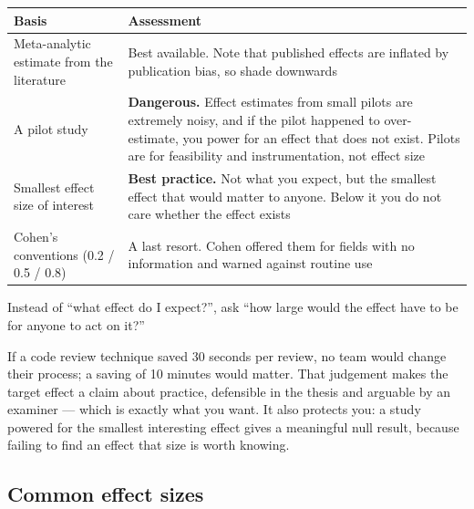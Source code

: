 \begin{center}
\small
\begin{tabular}{@{}L{4.0cm}L{10.3cm}@{}}
\toprule
\textbf{Basis} & \textbf{Assessment} \\
\midrule
Meta-analytic estimate from the literature
  & Best available. Note that published effects are inflated by publication
    bias, so shade downwards \\
A pilot study
  & \textbf{Dangerous.} Effect estimates from small pilots are extremely noisy,
    and if the pilot happened to over-estimate, you power for an effect that
    does not exist. Pilots are for feasibility and instrumentation, not effect
    size \\
Smallest effect size of interest
  & \textbf{Best practice.} Not what you expect, but the smallest effect that
    would matter to anyone. Below it you do not care whether the effect exists \\
Cohen's conventions (0.2 / 0.5 / 0.8)
  & A last resort. Cohen offered them for fields with no information and
    warned against routine use \\
\bottomrule
\end{tabular}
\end{center}

\begin{conceptbox}
Instead of ``what effect do I expect?'', ask ``how large would the effect have
to be for anyone to act on it?''

\medskip
If a code review technique saved 30 seconds per review, no team would change
their process; a saving of 10 minutes would matter. That judgement makes the
target effect a claim about practice, defensible in the thesis and arguable by
an examiner --- which is exactly what you want. It also protects you: a study
powered for the smallest interesting effect gives a meaningful null result,
because failing to find an effect that size is worth knowing.
\end{conceptbox}

\subsection{Common effect sizes}

